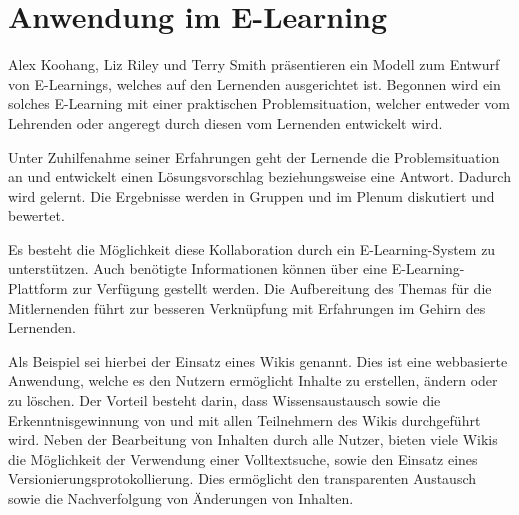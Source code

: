 \section{Anwendung im E-Learning}
\label{sec:Konstr_Anwendungsfaelle}
Alex Koohang, Liz Riley und Terry Smith präsentieren ein Modell zum Entwurf von E-Learnings, welches auf den Lernenden ausgerichtet ist. Begonnen wird ein solches E-Learning mit einer praktischen Problemsituation, welcher entweder vom Lehrenden oder angeregt durch diesen vom Lernenden entwickelt wird.\cite[S. 95]{Koohang.2009}
 
Unter Zuhilfenahme seiner Erfahrungen geht der Lernende die Problemsituation an und entwickelt einen Lösungsvorschlag beziehungsweise eine Antwort. Dadurch wird gelernt. Die Ergebnisse werden in Gruppen und im Plenum diskutiert und bewertet. \cite[S. 95 f.]{Koohang.2009}

Es besteht die Möglichkeit diese Kollaboration durch ein E-Learning-System zu unterstützen. Auch benötigte Informationen können über eine E-Learning-Plattform zur Verfügung gestellt werden. \cite[S. 96]{Koohang.2009} Die Aufbereitung des Themas für die Mitlernenden führt zur besseren Verknüpfung mit Erfahrungen im Gehirn des Lernenden. \cite[S. 101 f.]{Koohang.2009}

Als Beispiel sei hierbei der Einsatz eines Wikis genannt. Dies ist eine webbasierte Anwendung, welche es den Nutzern ermöglicht Inhalte zu erstellen, ändern oder zu löschen. Der Vorteil besteht darin, dass Wissensaustausch sowie die Erkenntnisgewinnung von und mit allen Teilnehmern des Wikis durchgeführt wird. Neben der Bearbeitung von Inhalten durch alle Nutzer, bieten viele Wikis die Möglichkeit der Verwendung einer Volltextsuche, sowie den Einsatz eines Versionierungsprotokollierung. Dies ermöglicht den transparenten Austausch sowie die Nachverfolgung von Änderungen von Inhalten. \cite[S. 75 f.]{Mertins.2009}

